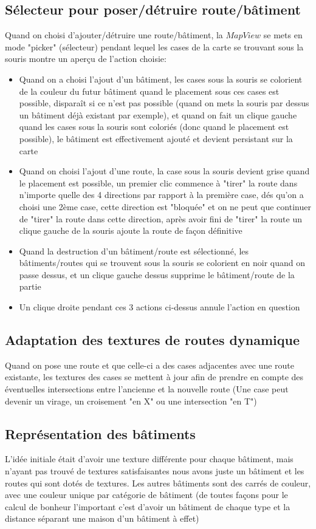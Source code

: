 \documentclass[a4paper,10pt,openany,oneside]{report}
\begin{document}
\subsection{Sélecteur pour poser/détruire route/bâtiment}
Quand on choisi d'ajouter/détruire une route/bâtiment, la $MapView$ se mets en mode "picker" (sélecteur) pendant lequel les cases de la carte se trouvant sous la souris montre un aperçu de l'action choisie:
\begin{itemize}
\item Quand on a choisi l'ajout d'un bâtiment, les cases sous la souris se colorient de la couleur du futur bâtiment quand le placement sous ces cases est possible, disparaît si ce n'est pas possible (quand on mets la souris par dessus un bâtiment déjà existant par exemple), et quand on fait un clique gauche quand les cases sous la souris sont coloriés (donc quand le placement est possible), le bâtiment est effectivement ajouté et devient persistant sur la carte
\item Quand on choisi l'ajout d'une route, la case sous la souris devient grise quand le placement est possible, un premier clic commence à "tirer" la route dans n'importe quelle des 4 directions par rapport à la première case, dés qu'on a choisi une 2ème case, cette direction est "bloquée" et on ne peut que continuer de "tirer" la route dans cette direction, après avoir fini de "tirer" la route un clique gauche de la souris ajoute la route de façon définitive
\item Quand la destruction d'un bâtiment/route est sélectionné, les bâtiments/routes qui se trouvent sous la souris se colorient en noir quand on passe dessus, et un clique gauche dessus supprime le bâtiment/route de la partie
\item Un clique droite pendant ces 3 actions ci-dessus annule l'action en question
\end{itemize}
\subsection{Adaptation des textures de routes dynamique}
Quand on pose une route et que celle-ci a des cases adjacentes avec une route existante, les textures des cases se mettent à jour afin de prendre en compte des éventuelles intersections entre l'ancienne et la nouvelle route (Une case peut devenir un virage, un croisement "en X" ou une intersection "en T")
\subsection{Représentation des bâtiments}
L'idée initiale était d'avoir une texture différente pour chaque bâtiment, mais n'ayant pas trouvé de textures satisfaisantes nous avons juste un bâtiment et les routes qui sont dotés de textures.
\newline
Les autres bâtiments sont des carrés de couleur, avec une couleur unique par catégorie de bâtiment (de toutes façons pour le calcul de bonheur l'important c'est d'avoir un bâtiment de chaque type et la distance séparant une maison d'un bâtiment à effet)
\end{document}
